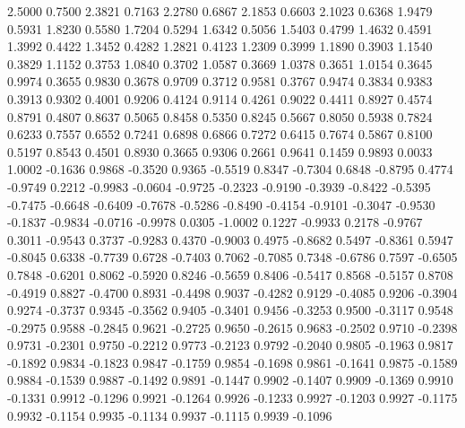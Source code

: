     2.5000    0.7500
    2.3821    0.7163
    2.2780    0.6867
    2.1853    0.6603
    2.1023    0.6368
    1.9479    0.5931
    1.8230    0.5580
    1.7204    0.5294
    1.6342    0.5056
    1.5403    0.4799
    1.4632    0.4591
    1.3992    0.4422
    1.3452    0.4282
    1.2821    0.4123
    1.2309    0.3999
    1.1890    0.3903
    1.1540    0.3829
    1.1152    0.3753
    1.0840    0.3702
    1.0587    0.3669
    1.0378    0.3651
    1.0154    0.3645
    0.9974    0.3655
    0.9830    0.3678
    0.9709    0.3712
    0.9581    0.3767
    0.9474    0.3834
    0.9383    0.3913
    0.9302    0.4001
    0.9206    0.4124
    0.9114    0.4261
    0.9022    0.4411
    0.8927    0.4574
    0.8791    0.4807
    0.8637    0.5065
    0.8458    0.5350
    0.8245    0.5667
    0.8050    0.5938
    0.7824    0.6233
    0.7557    0.6552
    0.7241    0.6898
    0.6866    0.7272
    0.6415    0.7674
    0.5867    0.8100
    0.5197    0.8543
    0.4501    0.8930
    0.3665    0.9306
    0.2661    0.9641
    0.1459    0.9893
    0.0033    1.0002
   -0.1636    0.9868
   -0.3520    0.9365
   -0.5519    0.8347
   -0.7304    0.6848
   -0.8795    0.4774
   -0.9749    0.2212
   -0.9983   -0.0604
   -0.9725   -0.2323
   -0.9190   -0.3939
   -0.8422   -0.5395
   -0.7475   -0.6648
   -0.6409   -0.7678
   -0.5286   -0.8490
   -0.4154   -0.9101
   -0.3047   -0.9530
   -0.1837   -0.9834
   -0.0716   -0.9978
    0.0305   -1.0002
    0.1227   -0.9933
    0.2178   -0.9767
    0.3011   -0.9543
    0.3737   -0.9283
    0.4370   -0.9003
    0.4975   -0.8682
    0.5497   -0.8361
    0.5947   -0.8045
    0.6338   -0.7739
    0.6728   -0.7403
    0.7062   -0.7085
    0.7348   -0.6786
    0.7597   -0.6505
    0.7848   -0.6201
    0.8062   -0.5920
    0.8246   -0.5659
    0.8406   -0.5417
    0.8568   -0.5157
    0.8708   -0.4919
    0.8827   -0.4700
    0.8931   -0.4498
    0.9037   -0.4282
    0.9129   -0.4085
    0.9206   -0.3904
    0.9274   -0.3737
    0.9345   -0.3562
    0.9405   -0.3401
    0.9456   -0.3253
    0.9500   -0.3117
    0.9548   -0.2975
    0.9588   -0.2845
    0.9621   -0.2725
    0.9650   -0.2615
    0.9683   -0.2502
    0.9710   -0.2398
    0.9731   -0.2301
    0.9750   -0.2212
    0.9773   -0.2123
    0.9792   -0.2040
    0.9805   -0.1963
    0.9817   -0.1892
    0.9834   -0.1823
    0.9847   -0.1759
    0.9854   -0.1698
    0.9861   -0.1641
    0.9875   -0.1589
    0.9884   -0.1539
    0.9887   -0.1492
    0.9891   -0.1447
    0.9902   -0.1407
    0.9909   -0.1369
    0.9910   -0.1331
    0.9912   -0.1296
    0.9921   -0.1264
    0.9926   -0.1233
    0.9927   -0.1203
    0.9927   -0.1175
    0.9932   -0.1154
    0.9935   -0.1134
    0.9937   -0.1115
    0.9939   -0.1096